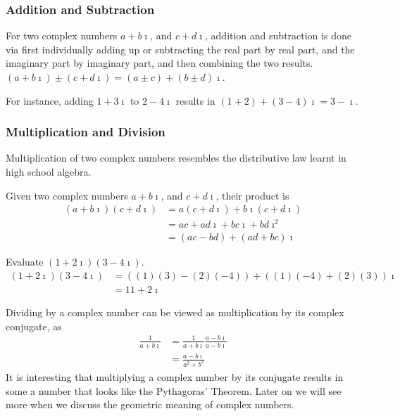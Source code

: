 \subsubsection{Addition and Subtraction}
\begin{defn}
For two complex numbers $a + b\imath$, and $c + d\imath$, addition and subtraction is done via first individually adding up or subtracting the real part by real part, and the imaginary part by imaginary part, and then combining the two results. $(a + b\imath) \pm (c + d\imath) = (a \pm c) + (b \pm d)\imath$.
\end{defn}
For instance, adding $1 + 3\imath$ to $2 - 4\imath$ results in $(1+2) + (3-4)\imath = 3 - \imath$.

\subsubsection{Multiplication and Division}
Multiplication of two complex numbers resembles the distributive law learnt in high school algebra.
\begin{defn}
Given two complex numbers $a + b\imath$, and $c + d\imath$, their product is
\begin{align*}
(a + b\imath)(c + d\imath) &= a(c + d\imath) + b\imath(c + d\imath)\\
&= ac + ad\imath + bc\imath + bd\imath^2 \\
&= (ac - bd) + (ad + bc)\imath
\end{align*}
\end{defn}

\begin{exmp}
Evaluate $(1+2\imath)(3-4\imath)$.
\begin{align*}
(1+2\imath)(3-4\imath) &= ((1)(3) - (2)(-4)) + ((1)(-4) + (2)(3))\imath \\
&= 11 + 2\imath
\end{align*}
\end{exmp}

Dividing by a complex number can be viewed as multiplication by its complex conjugate, as
\begin{align*}
\frac{1}{a+b\imath} &= \frac{1}{a+b\imath}\frac{a-b\imath}{a-b\imath} \\
&= \frac{a-b\imath}{a^2 + b^2}
\end{align*}
It is interesting that multiplying a complex number by its conjugate results in some a number that looks like the Pythagoras' Theorem. Later on we will see more when we discuss the geometric meaning of complex numbers.

